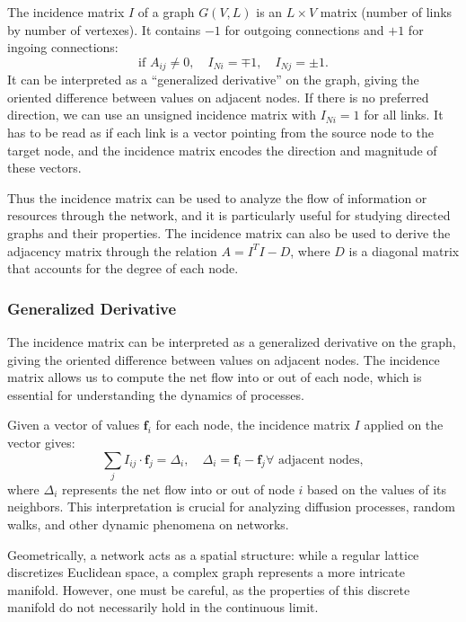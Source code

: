 \begin{definition}
    The incidence matrix $I$ of a graph $G(V,L)$ is an $L \times V$ matrix (number of links by number of vertexes). It contains $-1$ for outgoing connections and $+1$ for ingoing connections:
    \[
        \text{if } A_{ij} \neq 0, \quad I_{Ni} = \mp 1, \quad I_{Nj} = \pm 1.
    \]
    It can be interpreted as a ``generalized derivative'' on the graph, giving the oriented difference between values on adjacent nodes. If there is no preferred direction, we can use an unsigned incidence matrix with $I_{Ni} = 1$ for all links. It has to be read as if each link is a vector pointing from the source node to the target node, and the incidence matrix encodes the direction and magnitude of these vectors.
\end{definition}

Thus the incidence matrix can be used to analyze the flow of information or resources through the network, and it is particularly useful for studying directed graphs and their properties. The incidence matrix can also be used to derive the adjacency matrix through the relation $A = I^T I - D$, where $D$ is a diagonal matrix that accounts for the degree of each node.

\subsubsection{Generalized Derivative}

The incidence matrix can be interpreted as a generalized derivative on the graph, giving the oriented difference between values on adjacent nodes. The incidence matrix allows us to compute the net flow into or out of each node, which is essential for understanding the dynamics of processes.

Given a vector of values \(\mathbf{f}_i\) for each node, the incidence matrix \(I\) applied on the vector gives:
\[
    \sum_{j} I_{ij} \cdot \mathbf{f}_j  = \Delta_i,                                                  \quad
    \Delta_i                            = \mathbf{f}_i - \mathbf{f}_j \forall \text{ adjacent nodes},
\]
where \(\Delta_i\) represents the net flow into or out of node \(i\) based on the values of its neighbors. This interpretation is crucial for analyzing diffusion processes, random walks, and other dynamic phenomena on networks.

Geometrically, a network acts as a spatial structure: while a regular lattice discretizes Euclidean space, a complex graph represents a more intricate manifold. However, one must be careful, as the properties of this discrete manifold do not necessarily hold in the continuous limit.

